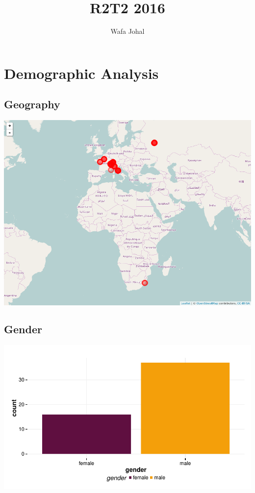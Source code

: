 \documentclass{article}
\title{R2T2 2016}
\author{Wafa Johal}
\begin{document}
\maketitle
\tableofcontents











\section{Demographic Analysis}


\subsection{Geography}

\includegraphics{Raw_num/plots/map.png}


\subsection{Gender}
\includegraphics{Raw_num/plots/-plot_gender}
\end{document}
